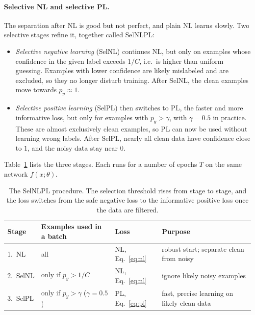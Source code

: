 \paragraph{Selective NL and selective PL.}
The separation after NL is good but not perfect, and plain NL learns slowly.
Two selective stages refine it, together called SelNLPL:
\begin{itemize}
  \item \emph{Selective negative learning} (SelNL) continues NL, but only on
    examples whose confidence in the given label exceeds $1/C$, i.e.\ is
    higher than uniform guessing. Examples with lower confidence are likely
    mislabeled and are excluded, so they no longer disturb training. After
    SelNL, the clean examples move towards $p_y\approx1$.
  \item \emph{Selective positive learning} (SelPL) then switches to PL, the
    faster and more informative loss, but only for examples with $p_y>\gamma$,
    with $\gamma=0.5$ in practice. These are almost exclusively clean
    examples, so PL can now be used without learning wrong labels. After
    SelPL, nearly all clean data have confidence close to $1$, and the noisy
    data stay near $0$.
\end{itemize}
Table~\ref{tab:selnlpl} lists the three stages. Each runs for a number of
epochs $T$ on the same network $f(x;\theta)$.

\begin{table}[ht]
  \centering
  \begin{tabular}{@{}p{1.9cm}p{4.3cm}p{2.2cm}p{5.4cm}@{}}
    \toprule
    Stage & Examples used in a batch & Loss & Purpose \\
    \midrule
    1.\ NL & all & NL, Eq.~\ref{eq:nl} & robust start; separate clean from
      noisy \\
    2.\ SelNL & only if $p_y>1/C$ & NL, Eq.~\ref{eq:nl} & ignore likely noisy
      examples \\
    3.\ SelPL & only if $p_y>\gamma$ ($\gamma=0.5$) & PL, Eq.~\ref{eq:pl} &
      fast, precise learning on likely clean data \\
    \bottomrule
  \end{tabular}
  \caption{The SelNLPL procedure. The selection threshold rises from stage
  to stage, and the loss switches from the safe negative loss to the
  informative positive loss once the data are filtered.}
  \label{tab:selnlpl}
\end{table}

